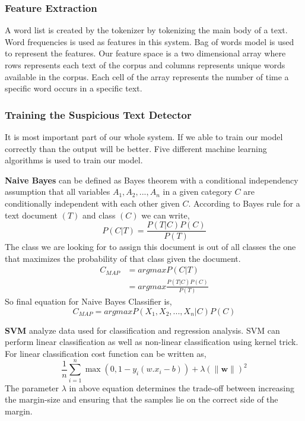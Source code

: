 \subsubsection{\textbf{Feature Extraction}}
A word list is created by the tokenizer by tokenizing the main body of a text. Word frequencies is used as features in this system. Bag of words model is used to represent the features. Our feature space is a two dimensional array where rows represents each text of the corpus and columns represents unique words available in the corpus. Each cell of the array represents the number of time a specific word occurs in a specific text.
\subsubsection{\textbf{Training the Suspicious Text Detector}}
It is most important part of our whole system. If we able to train our model correctly than the output will be better. Five different machine learning algorithms is used to train our model. 
\vspace{0.3cm}

\textbf{Naive Bayes}\cite{yoo2015classification} can be defined as Bayes theorem with a conditional independency assumption that all variables $A_{1},A_{2},...,A_{n}$ in a given category $C$ are conditionally independent with each other given $C$. 
According to Bayes rule for a text document $(T)$ and class $(C)$ we can write,
\begin{equation}
    P(C|T) = \frac{P(T|C)P(C)}{P(T)}
\end{equation}
The class we are looking for to assign this document is out of all classes the one that maximizes the probability of that class given the document.
\begin{equation}\label{eq:11}
 \begin{aligned}
     C_{MAP} & = argmax P(C|T) \\     & = argmax \frac{P(T|C)P(C)}{P(T)}
\end{aligned}
\end{equation}
So final equation for Naive Bayes Classifier is,
\begin{equation}
     C_{MAP} = argmax P(X_{1},X_{2},...,X_{n}|C)P(C)
\end{equation}
\vspace{0.1cm}

\textbf{SVM}\cite{wei2012text} analyze data used for classification and regression analysis. SVM can perform linear classification as well as non-linear classification using kernel trick. For linear classification cost function can be written as,
\begin{equation}
    \label{cost_function_svm}
    \frac{1}{n}\sum_{i=1}^{n}\max{(0,1-y_{i}(w.x_{i}-b))} + \lambda (\lVert \mathbf{w} \rVert)^2
\end{equation}
The parameter $\lambda $ in above equation determines the trade-off between increasing the margin-size and ensuring that the samples lie on the correct side of the margin.

